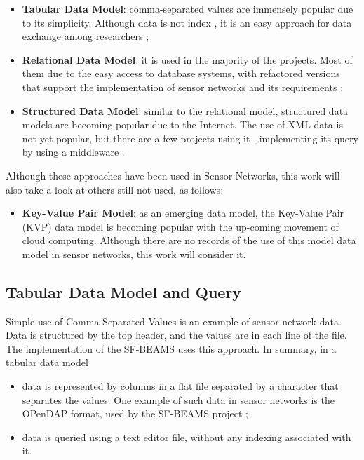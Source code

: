 \begin{itemize}
  \item \textbf{Tabular Data Model}: comma-separated values are immensely
  popular due to its simplicity. Although data is not index , it is an easy
  approach for data exchange among researchers \cite{sn-provenance};
  \item \textbf{Relational Data Model}: it is used in the majority of the
  projects. Most of them due to the easy access to database systems, with
  refactored versions that support the implementation of sensor networks and
  its requirements \cite{sn-db-tinydb};
  \item \textbf{Structured Data Model}: similar to the relational model,
  structured data models are becoming popular due to the Internet. The use of
  XML data \cite{xml} is not yet popular, but there are a few projects using
  it \cite{sn-xml-usage01}\cite{sn-xml-usage02}, implementing its query by
  using a middleware \cite{sn-xml-middleware}\cite{sn-xml-query-engines}.
\end{itemize}

Although these approaches have been used in Sensor Networks, this work will
also take a look at others still not used, as follows:

\begin{itemize}
  \item \textbf{Key-Value Pair Model}: as an emerging data model, the Key-Value
  Pair (KVP) \cite{db-kvp} data model is becoming popular with the up-coming
  movement of cloud computing. Although there are no records of the use of this
  model data model in sensor networks, this work will consider it.
\end{itemize}

\subsection{Tabular Data Model and Query}

Simple use of Comma-Separated Values is an example of sensor network data. Data
is structured by the top header, and the values are in each line of the file.
The implementation of the SF-BEAMS \cite{sfbeams2006} uses this approach. In
summary, in a tabular data model 

\begin{itemize}
  \item data is represented by columns in a flat file separated by a character
  that separates the values. One example of such data in sensor networks is the
  OPenDAP \cite{opendap} format, used by the SF-BEAMS project
  \cite{sfbeams2006};
  \item data is queried using a text editor file, without any indexing
  associated with it.
\end{itemize}

